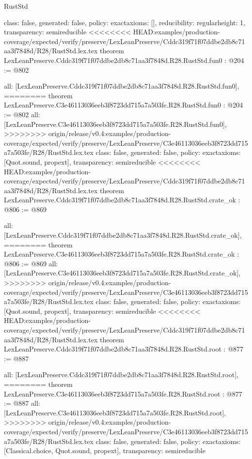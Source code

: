 \begin{lexlean}{RustStd}
\begin{coremodule}
{\begin{coremodule}
{{{  class: false,
  generated: false,
  policy: exact{axioms: []},
  reducibility: regular{height: 1},
  transparency: semireducible
}
<<<<<<<< HEAD:examples/production-coverage/expected/verify/preserve/LexLeanPreserve/Cddc319f71f07ddbe2db8c71aa3f7848d/R28/RustStd.lex.tex
theorem LexLeanPreserve.Cddc319f71f07ddbe2db8c71aa3f7848d.R28.RustStd.fun0 : @204 := @802 {
  all: [LexLeanPreserve.Cddc319f71f07ddbe2db8c71aa3f7848d.R28.RustStd.fun0],
========
theorem LexLeanPreserve.C3e46113036eeb3f8723dd715a7a503fe.R28.RustStd.fun0 : @204 := @802 {
  all: [LexLeanPreserve.C3e46113036eeb3f8723dd715a7a503fe.R28.RustStd.fun0],
>>>>>>>> origin/release/v0.4:examples/production-coverage/expected/verify/preserve/LexLeanPreserve/C3e46113036eeb3f8723dd715a7a503fe/R28/RustStd.lex.tex
  class: false,
  generated: false,
  policy: exact{axioms: [Quot.sound, propext]},
  transparency: semireducible
}
<<<<<<<< HEAD:examples/production-coverage/expected/verify/preserve/LexLeanPreserve/Cddc319f71f07ddbe2db8c71aa3f7848d/R28/RustStd.lex.tex
theorem LexLeanPreserve.Cddc319f71f07ddbe2db8c71aa3f7848d.R28.RustStd.crate_ok : @806 := @869 {
  all: [LexLeanPreserve.Cddc319f71f07ddbe2db8c71aa3f7848d.R28.RustStd.crate_ok],
========
theorem LexLeanPreserve.C3e46113036eeb3f8723dd715a7a503fe.R28.RustStd.crate_ok : @806 := @869 {
  all: [LexLeanPreserve.C3e46113036eeb3f8723dd715a7a503fe.R28.RustStd.crate_ok],
>>>>>>>> origin/release/v0.4:examples/production-coverage/expected/verify/preserve/LexLeanPreserve/C3e46113036eeb3f8723dd715a7a503fe/R28/RustStd.lex.tex
  class: false,
  generated: false,
  policy: exact{axioms: [Quot.sound, propext]},
  transparency: semireducible
}
<<<<<<<< HEAD:examples/production-coverage/expected/verify/preserve/LexLeanPreserve/Cddc319f71f07ddbe2db8c71aa3f7848d/R28/RustStd.lex.tex
theorem LexLeanPreserve.Cddc319f71f07ddbe2db8c71aa3f7848d.R28.RustStd.root : @877 := @887 {
  all: [LexLeanPreserve.Cddc319f71f07ddbe2db8c71aa3f7848d.R28.RustStd.root],
========
theorem LexLeanPreserve.C3e46113036eeb3f8723dd715a7a503fe.R28.RustStd.root : @877 := @887 {
  all: [LexLeanPreserve.C3e46113036eeb3f8723dd715a7a503fe.R28.RustStd.root],
>>>>>>>> origin/release/v0.4:examples/production-coverage/expected/verify/preserve/LexLeanPreserve/C3e46113036eeb3f8723dd715a7a503fe/R28/RustStd.lex.tex
  class: false,
  generated: false,
  policy: exact{axioms: [Classical.choice, Quot.sound, propext]},
  transparency: semireducible
}

}}}}}
\end{coremodule}}
\end{coremodule}
\end{lexlean}
